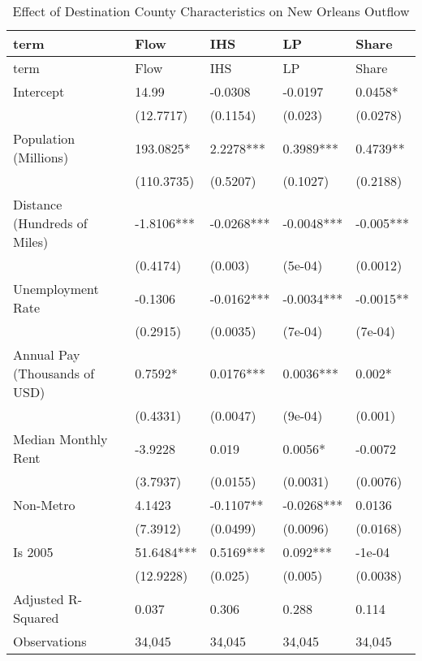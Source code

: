 \documentclass[]{article}
\begin{document}
\begin{longtable}[]{@{}lllll@{}}
\caption{\label{tab:reg_main}Effect of Destination County
Characteristics on New Orleans Outflow}\tabularnewline
\toprule
term & Flow & IHS & LP & Share\tabularnewline
\midrule
\endfirsthead
\toprule
term & Flow & IHS & LP & Share\tabularnewline
\midrule
\endhead
Intercept & 14.99 & -0.0308 & -0.0197 & 0.0458*\tabularnewline
& (12.7717) & (0.1154) & (0.023) & (0.0278)\tabularnewline
Population (Millions) & 193.0825* & 2.2278*** & 0.3989*** &
0.4739**\tabularnewline
& (110.3735) & (0.5207) & (0.1027) & (0.2188)\tabularnewline
Distance (Hundreds of Miles) & -1.8106*** & -0.0268*** & -0.0048*** &
-0.005***\tabularnewline
& (0.4174) & (0.003) & (5e-04) & (0.0012)\tabularnewline
Unemployment Rate & -0.1306 & -0.0162*** & -0.0034*** &
-0.0015**\tabularnewline
& (0.2915) & (0.0035) & (7e-04) & (7e-04)\tabularnewline
Annual Pay (Thousands of USD) & 0.7592* & 0.0176*** & 0.0036*** &
0.002*\tabularnewline
& (0.4331) & (0.0047) & (9e-04) & (0.001)\tabularnewline
Median Monthly Rent & -3.9228 & 0.019 & 0.0056* & -0.0072\tabularnewline
& (3.7937) & (0.0155) & (0.0031) & (0.0076)\tabularnewline
Non-Metro & 4.1423 & -0.1107** & -0.0268*** & 0.0136\tabularnewline
& (7.3912) & (0.0499) & (0.0096) & (0.0168)\tabularnewline
Is 2005 & 51.6484*** & 0.5169*** & 0.092*** & -1e-04\tabularnewline
& (12.9228) & (0.025) & (0.005) & (0.0038)\tabularnewline
Adjusted R-Squared & 0.037 & 0.306 & 0.288 & 0.114\tabularnewline
Observations & 34,045 & 34,045 & 34,045 & 34,045\tabularnewline
\bottomrule
\end{longtable}

\newpage

\scriptsize
\end{document}
